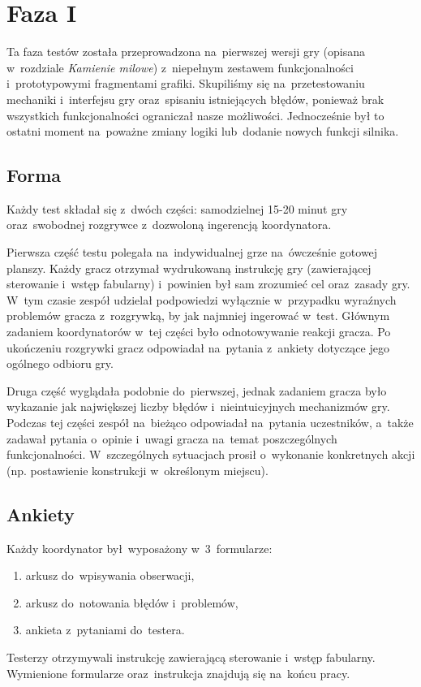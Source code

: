 \documentclass[licencjacka]{pracamgr}
\begin{document}
  \section{Faza I}
    Ta faza testów została przeprowadzona na~pierwszej wersji gry (opisana w~rozdziale \emph{Kamienie milowe})
    z~niepełnym zestawem funkcjonalności i~prototypowymi fragmentami grafiki. Skupiliśmy się na~przetestowaniu mechaniki
    i~interfejsu gry oraz~spisaniu istniejących błędów, ponieważ brak wszystkich funkcjonalności ograniczał nasze możliwości.
    Jednocześnie był to ostatni moment na~poważne zmiany logiki lub~dodanie nowych funkcji silnika.

    \subsection{Forma}
      Każdy test składał  się z~dwóch części: samodzielnej 15-20 minut gry
      oraz~swobodnej rozgrywce z~dozwoloną ingerencją koordynatora.

      Pierwsza część testu polegała na~indywidualnej grze na~ówcześnie gotowej planszy.
      Każdy gracz otrzymał wydrukowaną instrukcję gry (zawierającej sterowanie i~wstęp fabularny)
      i~powinien był sam zrozumieć cel oraz~zasady gry. W~tym czasie zespół udzielał podpowiedzi
      wyłącznie w~przypadku wyraźnych problemów gracza z~rozgrywką, by jak najmniej ingerować w~test.
      Głównym zadaniem koordynatorów w~tej części było odnotowywanie reakcji gracza.
      Po ukończeniu rozgrywki gracz odpowiadał na~pytania z~ankiety dotyczące jego ogólnego odbioru gry.

      Druga część wyglądała podobnie do~pierwszej, jednak zadaniem gracza było wykazanie
      jak największej liczby błędów i~nieintuicyjnych mechanizmów gry.
      Podczas tej części zespół na~bieżąco odpowiadał na~pytania uczestników,
      a~także zadawał pytania o~opinie i~uwagi gracza na~temat poszczególnych funkcjonalności.
      W~szczególnych sytuacjach prosił o~wykonanie konkretnych akcji (np. postawienie konstrukcji w~określonym miejscu).

    \subsection{Ankiety}
      Każdy koordynator był~wyposażony w~3~formularze:
      \begin{enumerate}
	\item arkusz do~wpisywania obserwacji,
	\item arkusz do~notowania błędów i~problemów,
	\item ankieta z~pytaniami do~testera.
      \end{enumerate}
      Testerzy otrzymywali instrukcję zawierającą sterowanie i~wstęp fabularny. Wymienione formularze oraz~instrukcja
      znajdują się na~końcu pracy.
\end{document}
